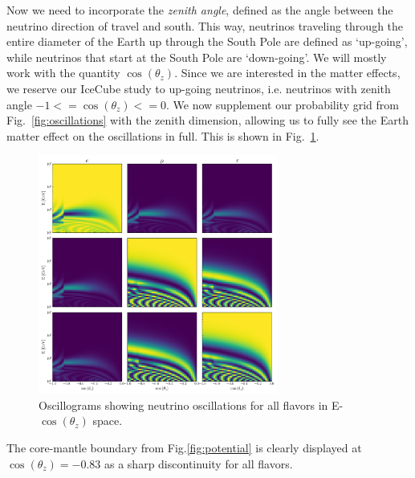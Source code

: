 Now we need to incorporate the \emph{zenith angle}, defined as the angle between the neutrino direction of travel and south.
This way, neutrinos traveling through the entire diameter of the Earth up through the South Pole are defined as `up-going', while
neutrinos that start at the South Pole are `down-going'. We will mostly work with the quantity $\cos{(\theta_z)}$.
Since we are interested in the matter effects, we reserve our IceCube study to up-going neutrinos, i.e. neutrinos with
zenith angle $-1<= \cos{(\theta_z)}<=0$. We now supplement our probability grid from Fig.~\ref{fig:oscillations} with the zenith dimension,
allowing us to fully see the Earth matter effect on the oscillations in full. This is shown in Fig.~\ref{fig:oscillograms}.

\begin{figure}
    \centering
    \includegraphics[width=0.7\textwidth]{figures/oscillograms.pdf}
    \caption{Oscillograms showing neutrino oscillations for all flavors in E-$\cos(\theta_z)$ space.}\label{fig:oscillograms}%
\end{figure}%
The core-mantle boundary from Fig.\ref{fig:potential} is clearly displayed at $\cos{(\theta_z)} = -0.83$ as a sharp discontinuity for all flavors. 

% 